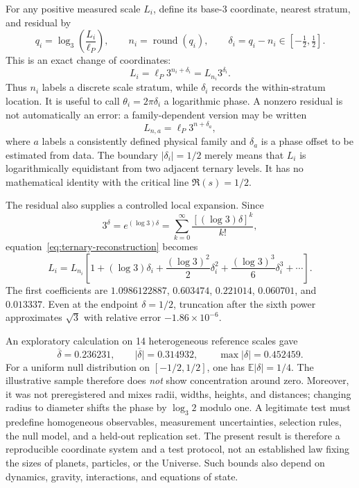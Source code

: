\documentclass[11pt]{amsart}
\theoremstyle{definition}
\theoremstyle{remark}
\begin{document}
For any positive measured scale $L_i$, define its base-$3$ coordinate, nearest stratum, and
residual by
\begin{equation}\label{eq:ternary-residual}
  q_i=\log_3\!\left(\frac{L_i}{\ell_P}\right),\qquad
  n_i=\operatorname{round}(q_i),\qquad
  \delta_i=q_i-n_i\in[-\tfrac12,\tfrac12].
\end{equation}
This is an exact change of coordinates:
\begin{equation}\label{eq:ternary-reconstruction}
  L_i=\ell_P3^{n_i+\delta_i}=L_{n_i}3^{\delta_i}.
\end{equation}
Thus $n_i$ labels a discrete scale stratum, while $\delta_i$ records the within-stratum location.
It is useful to call $\theta_i=2\pi\delta_i$ a logarithmic phase.  A nonzero residual is not
automatically an error: a family-dependent version may be written
\begin{equation}\label{eq:ternary-families}
  L_{n,a}=\ell_P3^{n+\delta_a},
\end{equation}
where $a$ labels a consistently defined physical family and $\delta_a$ is a phase offset to be
estimated from data.  The boundary $|\delta_i|=1/2$ merely means that $L_i$ is logarithmically
equidistant from two adjacent ternary levels.  It has no mathematical identity with the critical
line $\Re(s)=1/2$.

The residual also supplies a controlled local expansion.  Since
\begin{equation}
  3^\delta=e^{(\log3)\delta}
  =\sum_{k=0}^{\infty}\frac{[(\log3)\delta]^k}{k!},
\end{equation}
equation~\eqref{eq:ternary-reconstruction} becomes
\begin{equation}\label{eq:ternary-taylor}
  L_i=L_{n_i}\left[1+(\log3)\delta_i
  +\frac{(\log3)^2}{2}\delta_i^2
  +\frac{(\log3)^3}{6}\delta_i^3+\cdots\right].
\end{equation}
The first coefficients are $1.0986122887$, $0.603474$, $0.221014$, $0.060701$, and
$0.013337$.  Even at the endpoint $\delta=1/2$, truncation after the sixth power approximates
$\sqrt3$ with relative error $-1.86\times10^{-6}$.

An exploratory calculation on 14 heterogeneous reference scales gave
\begin{equation}
  \overline\delta=0.236231,\qquad
  \overline{|\delta|}=0.314932,\qquad
  \max|\delta|=0.452459.
\end{equation}
For a uniform null distribution on $[-1/2,1/2]$, one has
$\mathbb E|\delta|=1/4$.  The illustrative sample therefore does \emph{not} show concentration
around zero.  Moreover, it was not preregistered and mixes radii, widths, heights, and distances;
changing radius to diameter shifts the phase by $\log_3 2$ modulo one.  A legitimate test must
predefine homogeneous observables, measurement uncertainties, selection rules, the null model,
and a held-out replication set.  The present result is therefore a reproducible coordinate system
and a test protocol, not an established law fixing the sizes of planets, particles, or the
Universe.  Such bounds also depend on dynamics, gravity, interactions, and equations of state.
\end{document}
